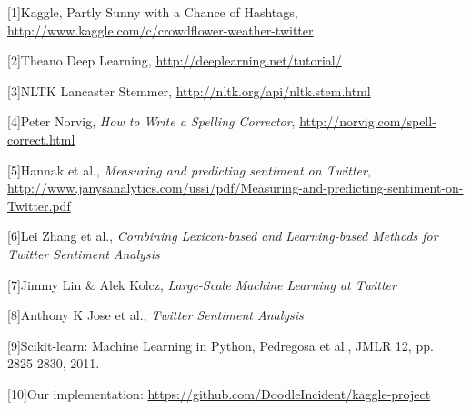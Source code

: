 \documentclass{article}
\begin{document}
\small{
	[1]Kaggle, Partly Sunny with a Chance of Hashtags, \url{http://www.kaggle.com/c/crowdflower-weather-twitter}
	
	[2]Theano Deep Learning, \url{http://deeplearning.net/tutorial/}
	
	[3]NLTK Lancaster Stemmer, \url{http://nltk.org/api/nltk.stem.html}
	
	[4]Peter Norvig, {\it How to Write a Spelling Corrector}, \url{http://norvig.com/spell-correct.html}

	[5]Hannak et al., {\it Measuring and predicting sentiment on Twitter}, \url{http://www.janysanalytics.com/ussi/pdf/Measuring-and-predicting-sentiment-on-Twitter.pdf}

	[6]Lei Zhang et al., {\it Combining Lexicon-based and Learning-based Methods for Twitter Sentiment Analysis}

	[7]Jimmy Lin \& Alek Kolcz, {\it Large-Scale Machine Learning at Twitter}

	[8]Anthony K Jose et al., {\it Twitter Sentiment Analysis}

	[9]Scikit-learn: Machine Learning in Python, Pedregosa et al., JMLR 12, pp. 2825-2830, 2011.

	[10]Our implementation: \url{https://github.com/DoodleIncident/kaggle-project}
}
\end{document}
